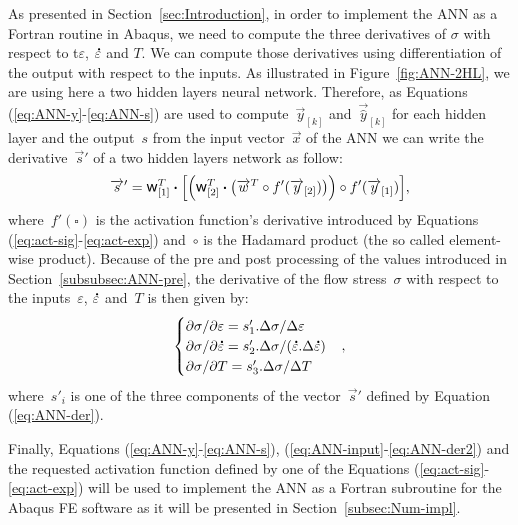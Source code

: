 \documentclass[algorithms,article,submit,pdftex,oneauthors]{Definitions/mdpi}
\DeclareRobustCommand{\w}{\mbox{\large\ensuremath{\mathsf{w}}}}
\DeclareRobustCommand{\dotp}{\boldsymbol{\cdot}}
\DeclareRobustCommand{\lay}[1]{_{[#1]}}
\DeclareRobustCommand{\mdot}[1]{\accentset{\mbox{\bfseries .}}{#1}}
\begin{document}
As presented in Section~\ref{sec:Introduction}, in order to implement the ANN as a Fortran routine in Abaqus, we need to compute the three derivatives of $\sigma$ with respect to t$\varepsilon$, $\mdot{\varepsilon}$ and $T$.
We can compute those derivatives using differentiation of the output with respect to the inputs.
As illustrated in Figure~\ref{fig:ANN-2HL}, we are using here a two hidden layers neural network.
Therefore, as Equations (\ref{eq:ANN-y}-\ref{eq:ANN-s}) are used to compute~$\overrightarrow{y}\lay{k}$ and~$\overrightarrow{\hat{y}}\lay{k}$ for each hidden layer and the output~$s$ from the input vector~$\overrightarrow{x}$ of the ANN we can write the derivative~$\overrightarrow{s}'$ of a two hidden layers network as follow:
\begin{equation}
\overrightarrow{s}' = \w\lay{1}^T \dotp\left[\left(\w\lay{2}^T \dotp \left(\overrightarrow{w}^T \circ f'(\overrightarrow{y}\lay{2})\right)\right) \circ f'(\overrightarrow{y}\lay{1})\right] \label{eq:ANN-der},
\end{equation}
where~$f'\left(\square\right)$ is the activation function's derivative introduced by Equations (\ref{eq:act-sig}-\ref{eq:act-exp}) and~$\circ$ is the Hadamard product (the so called element-wise product).
Because of the pre and post processing of the values introduced in Section~\ref{subsubsec:ANN-pre}, the derivative of the flow stress~$\sigma$ with respect to the inputs~$\varepsilon$, $\mdot{\varepsilon}$ and~$T$ is then given by:
\begin{equation}
\begin{cases}
\partial \sigma/\partial \varepsilon = s'_{1}.\Delta\sigma / \Delta\varepsilon\\
\partial \sigma/\partial\mdot{\varepsilon} = s'_{2}.\Delta\sigma / (\mdot{\varepsilon}.\Delta\mdot{\varepsilon})\\
\partial \sigma/\partial T = s'_{3}.\Delta\sigma / \Delta T
\end{cases}
\label{eq:ANN-der2},
\end{equation}
where~$s'_i$ is one of the three components of the vector~$\overrightarrow{s}'$ defined by Equation (\ref{eq:ANN-der}).

Finally, Equations (\ref{eq:ANN-y}-\ref{eq:ANN-s}), (\ref{eq:ANN-input}-\ref{eq:ANN-der2}) and the requested activation function defined by one of the Equations (\ref{eq:act-sig}-\ref{eq:act-exp}) will be used to implement the ANN as a Fortran subroutine for the Abaqus FE software as it will be presented in Section~\ref{subsec:Num-impl}.
\end{document}
